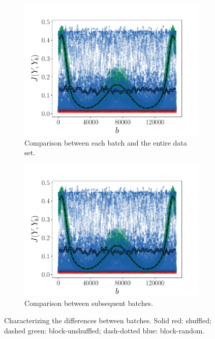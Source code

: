 \documentclass[review]{elsarticle}
\begin{document}
\begin{figure}[!tbp]%
  \centering%
  \begin{subfigure}[t]{0.48\textwidth}%
    \includegraphics[page=2, width=\textwidth]{./figs/jsds.pdf}%
    \caption{Comparison between each batch and the entire data set.}%
  \end{subfigure}\hfill%
  \begin{subfigure}[t]{0.48\textwidth}%
    \includegraphics[page=5, width=\textwidth]{./figs/jsds.pdf}%
    \caption{Comparison between subsequent batches.}%
  \end{subfigure}%
  \caption{Characterizing the differences between batches. Solid red: shuffled; dashed green: block-unshuffled; dash-dotted blue: block-random.}\label{fig:jsds}%
\end{figure}%
\end{document}
